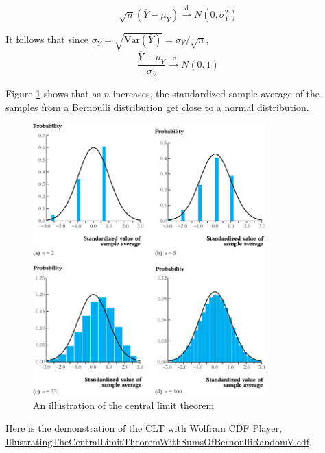 \documentclass[a4paper,11pt]{article}
\begin{document}
\[ \sqrt{n}(\overline{Y}-\mu_Y) \xrightarrow{\text{d}} N(0,
\sigma^2_Y) \]

It follows that since \(\sigma_{\overline{Y}} =
\sqrt{\mathrm{Var}(\overline{Y})} = \sigma_Y/\sqrt{n}\),
\[ \frac{\overline{Y} - \mu_Y}{\sigma_{\overline{Y}}}
\xrightarrow{\text{ d}} N(0, 1) \]

Figure \ref{fig:orgaa2d3b5} shows that as \(n\) increases, the standardized sample
average of the samples from a Bernoulli distribution get close to a
normal distribution. 

\begin{figure}[htbp]
\centering
\includegraphics[width=0.8\textwidth]{figure/fig-2-9.png}
\caption{\label{fig:orgaa2d3b5}
An illustration of the central limit theorem}
\end{figure}

Here is the demonstration of the CLT with Wolfram CDF Player,
\url{IllustratingTheCentralLimitTheoremWithSumsOfBernoulliRandomV.cdf}.
\end{document}
